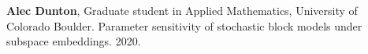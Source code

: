 \item \textbf{Alec Dunton},
      Graduate student in Applied Mathematics,
      University of Colorado Boulder.
      Parameter sensitivity of stochastic block models under subspace embeddings.
      2020.
